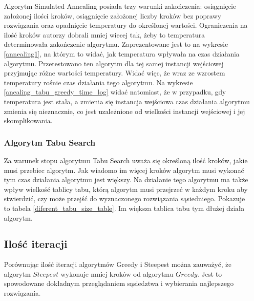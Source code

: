 Algorytm Simulated Annealing posiada trzy warunki zakończenia: osiągnięcie 
założonej ilości kroków, osiągnięcie założonej liczby kroków bez poprawy 
rozwiązania oraz opadnięcie temperatury do określonej wartości. Ograniczenia na
ilość kroków autorzy dobrali mniej wiecej tak, żeby to temperatura determinowała
zakończenie algorytmu. Zaprezentowane jest to na wykresie \ref{annealing1}, na
którym to widać, jak temperatura wpływała na czas działania algorytmu. 
Przetestowano ten algorytm dla tej samej instancji wejściowej przyjmując różne
wartości temperatury. Widać więc, że wraz ze wzrostem temperatury rośnie czas
działania tego algorytmu.
Na wykresie \ref{anealing_tabu_greedy_time_log} widać natomiast, że w przypadku, 
gdy temperatura jest stała, a zmienia się instancja wejściowa czas działania 
algorytmu zmienia się nieznacznie, co jest uzależnione od wielkości instancji
wejściowej i jej skomplikowania.

\subsubsection {Algorytm Tabu Search}

Za warunek stopu algorytmu Tabu Search uważa się określoną ilość kroków, jakie
musi przebiec algorytm. Jak wiadomo im więcej kroków algorytm musi wykonać tym
czas działania algorytmu jest większy. 
Na działanie tego algorytmu ma także wpływ wielkość tablicy tabu,
którą algorytm musi przejrzeć w każdym kroku aby stwierdzić, czy może przejść
do wyznaczonego rozwiązania sąsiedniego. Pokazuje to tabela 
\ref{diferent_tabu_size_table}. Im większa tablica tabu tym dłużej działa 
algorytm.

\subsection{Ilość iteracji}

Porównując ilość iteracji algorytmów Greedy i Steepest można zauważyć,
że algorytm $Steepest$ wykonuje mniej kroków od algorytmu $Greedy$.
Jest to spowodowane dokładnym przeglądaniem sąsiedztwa i wybierania
najlepszego rozwiązania.
